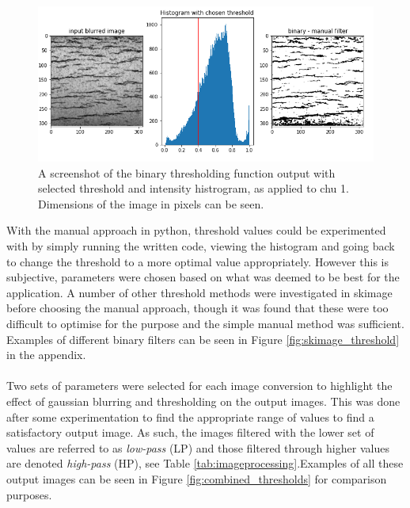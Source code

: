 \documentclass{article}
\begin{document}
	\begin{figure}[h]
	    \centering
	    \includegraphics[scale=0.5]{Figures/chu1_skbinary.png}
	    \caption{A screenshot of the binary thresholding function output with selected threshold and intensity histrogram, as applied to chu 1. Dimensions of the image in pixels can be seen.}
	    \label{skbinary}
	\end{figure}
	
	\noindent With the manual approach in python, threshold values could be experimented with by simply running the written code, viewing the histogram and going back to change the threshold to a more optimal value appropriately. However this is subjective, parameters were chosen based on what was deemed to be best for the application. A number of other threshold methods were investigated in skimage before choosing the manual approach, though it was found that these were too difficult to optimise for the purpose and the simple manual method was sufficient. Examples of different binary filters can be seen in Figure \ref{fig:skimage_threshold} in the appendix.
	\\
	\\
	\noindent Two sets of parameters were selected for each image conversion to highlight the effect of gaussian blurring and thresholding on the output images. This was done after some experimentation to find the appropriate range of values to find a satisfactory output image. As such, the images filtered with the lower set of values are referred to as \textit{low-pass} (LP) and those filtered through higher values are denoted \textit{high-pass} (HP), see Table \ref{tab:imageprocessing}.Examples of all these output images can be seen in Figure \ref{fig:combined_thresholds} for comparison purposes.
	
\end{document}
